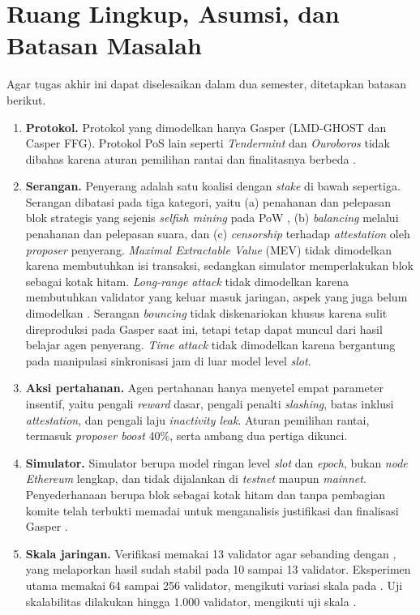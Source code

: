 \section{Ruang Lingkup, Asumsi, dan Batasan Masalah}
\label{sec:ruang_lingkup}
Agar tugas akhir ini dapat diselesaikan dalam dua semester, ditetapkan batasan berikut.
\begin{enumerate}
	\item \textbf{Protokol.} Protokol yang dimodelkan hanya Gasper (LMD-GHOST dan Casper FFG). Protokol PoS lain seperti \textit{Tendermint} dan \textit{Ouroboros} tidak dibahas karena aturan pemilihan rantai dan finalitasnya berbeda \parencite{laneve2025stochastic}.
	\item \textbf{Serangan.} Penyerang adalah satu koalisi dengan \textit{stake} di bawah sepertiga. Serangan dibatasi pada tiga kategori, yaitu (a) penahanan dan pelepasan blok strategis yang sejenis \textit{selfish mining} pada PoW \parencite{skowronski2026adaptive}, (b) \textit{balancing} melalui penahanan dan pelepasan suara, dan (c) \textit{censorship} terhadap \textit{attestation} oleh \textit{proposer} penyerang. \textit{Maximal Extractable Value} (MEV) tidak dimodelkan karena membutuhkan isi transaksi, sedangkan simulator memperlakukan blok sebagai kotak hitam. \textit{Long-range attack} tidak dimodelkan karena membutuhkan validator yang keluar masuk jaringan, aspek yang juga belum dimodelkan \textcite{laneve2025stochastic}. Serangan \textit{bouncing} tidak diskenariokan khusus karena sulit direproduksi pada Gasper saat ini, tetapi tetap dapat muncul dari hasil belajar agen penyerang. \textit{Time attack} tidak dimodelkan karena bergantung pada manipulasi sinkronisasi jam di luar model level \textit{slot}.
	\item \textbf{Aksi pertahanan.} Agen pertahanan hanya menyetel empat parameter insentif, yaitu pengali \textit{reward} dasar, pengali penalti \textit{slashing}, batas inklusi \textit{attestation}, dan pengali laju \textit{inactivity leak}. Aturan pemilihan rantai, termasuk \textit{proposer boost} 40\%, serta ambang dua pertiga dikunci.
	\item \textbf{Simulator.} Simulator berupa model ringan level \textit{slot} dan \textit{epoch}, bukan \textit{node Ethereum} lengkap, dan tidak dijalankan di \textit{testnet} maupun \textit{mainnet}. Penyederhanaan berupa blok sebagai kotak hitam dan tanpa pembagian komite telah terbukti memadai untuk menganalisis justifikasi dan finalisasi Gasper \parencite{laneve2025stochastic}.
	\item \textbf{Skala jaringan.} Verifikasi memakai 13 validator agar sebanding dengan \textcite{laneve2025stochastic}, yang melaporkan hasil sudah stabil pada 10 sampai 13 validator. Eksperimen utama memakai 64 sampai 256 validator, mengikuti variasi skala pada \textcite{skowronski2026adaptive}. Uji skalabilitas dilakukan hingga 1.000 validator, mengikuti uji skala \textcite{wushishi2026coadam}.

\end{enumerate}
